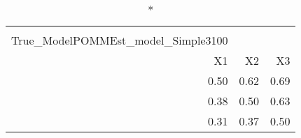 \begin{longtable}{rrr}
\caption*{
{\large Pestmatrix} \\ 
{\small True\_ModelPOMMEst\_model\_Simple3100}
} \\ 
\toprule
X1 & X2 & X3 \\ 
\midrule
0.50 & 0.62 & 0.69 \\ 
0.38 & 0.50 & 0.63 \\ 
0.31 & 0.37 & 0.50 \\ 
\bottomrule
\end{longtable}

